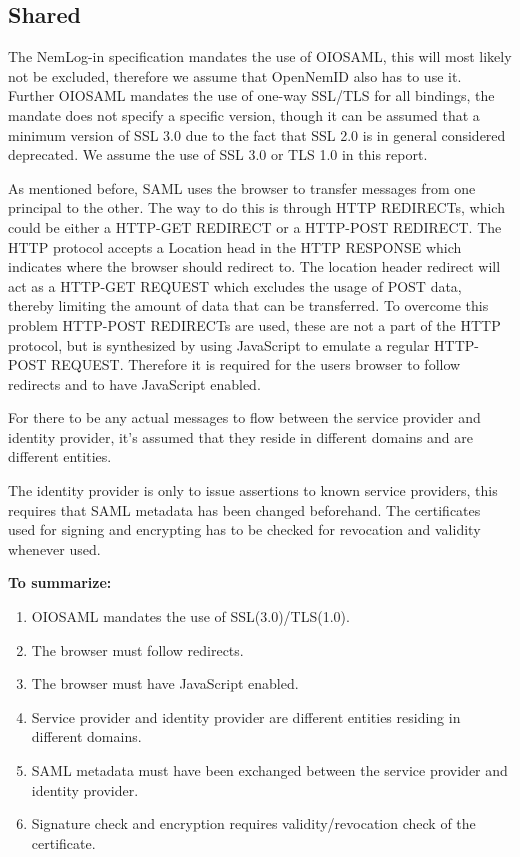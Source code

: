 \documentclass[twosided]{report}
\begin{document}
\subsection{Shared}
The NemLog-in specification mandates the use of OIOSAML, this will most likely not be excluded, therefore we assume that OpenNemID also has to use it. Further OIOSAML mandates the use of one-way SSL/TLS for all bindings, the mandate does not specify a specific version, though it can be assumed that a minimum version of SSL 3.0 due to the fact that SSL 2.0 is in general considered deprecated. We assume the use of SSL 3.0 or TLS 1.0 in this report.
\par
As mentioned before, SAML uses the browser to transfer messages from one principal to the other. The way to do this is through HTTP REDIRECTs, which could be either a HTTP-GET REDIRECT or a HTTP-POST REDIRECT. The HTTP protocol accepts a Location head in the HTTP RESPONSE which indicates where the browser should redirect to. The location header redirect will act as a HTTP-GET REQUEST which excludes the usage of POST data, thereby limiting the amount of data that can be transferred. To overcome this problem HTTP-POST REDIRECTs are used, these are not a part of the HTTP protocol, but is synthesized by using JavaScript to emulate a regular HTTP-POST REQUEST. Therefore it is required for the users browser to follow redirects and to have JavaScript enabled.
\par
For there to be any actual messages to flow between the service provider and identity provider, it's assumed that they reside in different domains and are different entities.
\par
The identity provider is only to issue assertions to known service providers, this requires that SAML metadata has been changed beforehand. The certificates used for signing and encrypting has to be checked for revocation and validity whenever used.
\par
\textbf{To summarize:}
\begin{enumerate}
	\item OIOSAML mandates the use of SSL(3.0)/TLS(1.0).
	\item The browser must follow redirects.
	\item The browser must have JavaScript enabled.
	\item Service provider and identity provider are different entities residing in different domains.
	\item SAML metadata must have been exchanged between the service provider and identity provider.
	\item Signature check and encryption requires validity/revocation check of the certificate.
\end{enumerate}
\end{document}

